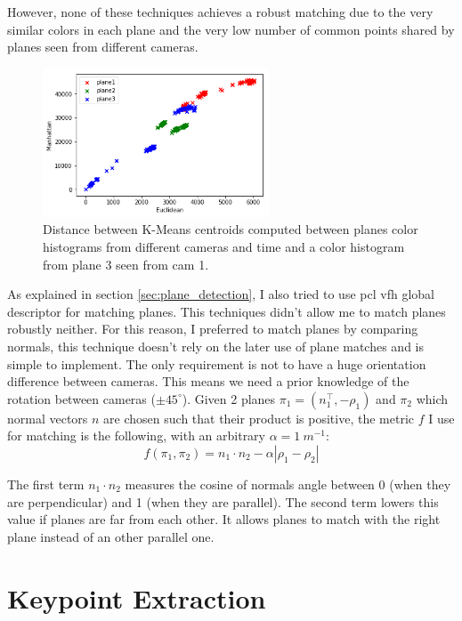However, none of these techniques achieves a robust matching due to the very similar colors in each plane and the very low number of common points shared by planes seen from different cameras.
    
\begin{figure}[h!]
\centering
\includegraphics[width=0.6\textwidth]{images/dst_hist.png}
\caption{Distance between K-Means centroids computed between planes color histograms from different cameras and time and a color histogram from plane 3 seen from cam 1.}
\label{fig:color_dist}
\end{figure}



As explained in section \ref{sec:plane_detection}, I also tried to use \acrshort{pcl} \acrshort{vfh} global descriptor for matching planes. This techniques didn't allow me to match planes robustly neither.
For this reason, I preferred to match planes by comparing normals, this technique doesn't rely on the later use of plane matches and is simple to implement. The only requirement is not to have a huge orientation difference between cameras. This means we need a prior knowledge of the rotation between cameras ($\pm 45^\circ$). Given 2 planes $\pi_1=(n_1^\top, -\rho_1)$ and $\pi_2$ which normal vectors $n$ are chosen such that their product is positive, the metric $f$ I use for matching is the following, with an arbitrary $\alpha = 1\:m^{-1}$:
\[
    f(\pi_1, \pi_2) = n_1\cdot n_2 - \alpha \left | \rho_1 - \rho_2 \right |
\]

The first term $n_1\cdot n_2$ measures the cosine of normals angle between 0 (when they are perpendicular) and 1 (when they are parallel). The second term lowers this value if planes are far from each other. It allows planes to match with the right plane instead of an other parallel one.

\section{Keypoint Extraction}

